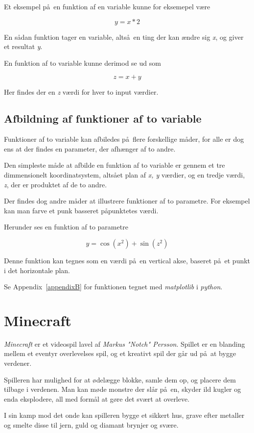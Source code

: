 \documentclass[a4paper,12pt]{report}
\begin{document}
		Et eksempel p\aa \ en funktion af en variable kunne for eksemepel v\ae re

		\[y = x * 2\]

		En s\aa dan funktion tager en variable, alts\aa \ en ting der kan \ae ndre sig \emph{x},
		og giver et resultat \emph{y}.

		En funktion af to variable kunne derimod se ud som

		\[z = x + y\]

		Her findes der en \emph{z} v\ae rdi for hver to input v\ae rdier.
	\section{Afbildning af funktioner af to variable}
		Funktioner af to variable kan afbiledes p\aa \ flere forskellige m\aa der, for alle er dog ens at
		der findes en parameter, der afh\ae nger af to andre.

		Den simpleste m\aa de at afbilde en funktion af to variable er gennem et tre dimmensionelt
		koordinatsystem, alts\aa et plan af \emph{x, y} v\ae rdier, og en tredje v\ae rdi, \emph{z},
		der er produktet af de to andre.

		Der findes dog andre m\aa der at illustrere funktioner af to parametre.
		For eksempel kan man farve et punk basseret p\aa punktetes v\ae rdi.

		Herunder ses en funktion af to parametre

		\[y = \cos (x^2) + \sin (z^2)\]

		Denne funktion kan tegnes som en v\ae rdi p\aa \ en vertical akse, baseret p\aa \ et punkt
		i det horizontale plan.
		
		Se Appendix~\ref{appendixB} for funktionen tegnet med \emph{matplotlib} i \emph{python}.
	\chapter{Minecraft}
		\emph{Minecraft} er et videospil lavel af \emph{Markus "Notch" Persson}.
		Spillet er en blanding mellem et eventyr overlevelses spil, og et kreativt spil der g\aa r ud p\aa \ at bygge verdener.

		Spilleren har mulighed for at \o del\ae gge blokke, samle dem op, og placere dem tilbage i verdenen.
		Man kan m\o de monstre der sl\aa r p\aa \ en, skyder ild kugler og enda eksplodere, all med form\aa l
		at g\o re det sv\ae rt at overleve.

		I sin kamp mod det onde kan spilleren bygge et sikkert hus, grave efter metaller og smelte disse
		til jern, guld og diamant brynjer og sv\ae re.
\end{document}
